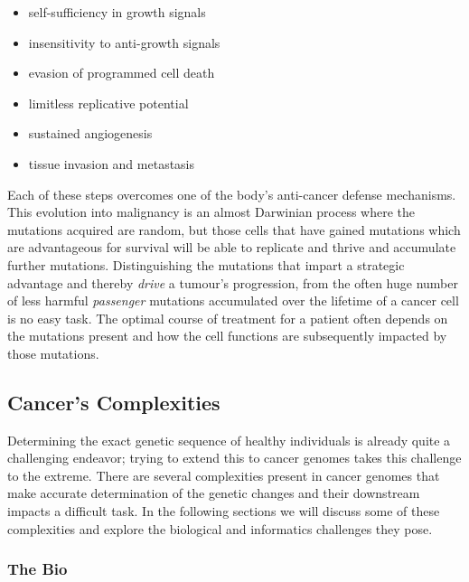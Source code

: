 \begin{justify}
\begin{itemize}
    \itemsep-0.5em
    \item self-sufficiency in growth signals
    \item insensitivity to anti-growth signals
    \item evasion of programmed cell death
    \item limitless replicative potential
    \item sustained angiogenesis
    \item tissue invasion and metastasis
\end{itemize}

Each of these steps overcomes one of the body's anti-cancer defense mechanisms. This evolution into malignancy is an almost Darwinian process where the mutations acquired are random, but those cells that have gained mutations which are advantageous for survival will be able to replicate and thrive and accumulate further mutations. Distinguishing the mutations that impart a strategic advantage and thereby \emph{drive} a tumour's progression, from the often huge number of less harmful \emph{passenger} mutations accumulated over the lifetime of a cancer cell is no easy task. The optimal course of treatment for a patient often depends on the mutations present and how the cell functions are subsequently impacted by those mutations. %



\subsection{Cancer's Complexities}

Determining the exact genetic sequence of healthy individuals is already quite a challenging endeavor; trying to extend this to cancer genomes takes this challenge to the extreme. There are several complexities present in cancer genomes that make accurate determination of the genetic changes and their downstream impacts a difficult task. In the following sections we will discuss some of these complexities and explore the biological and informatics challenges they pose.

\subsubsection{The Bio}

\end{justify}
